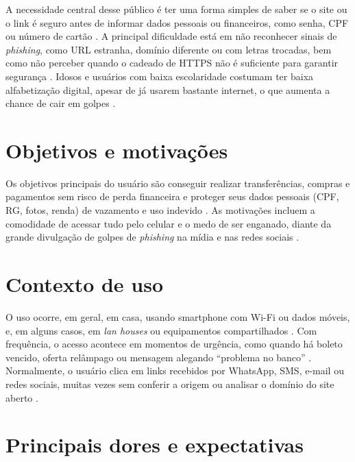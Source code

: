 \documentclass[
  12pt,
  a4paper,
  oneside,
  brazil
]{abntex2}
\begin{document}
A necessidade central desse público é ter uma forma simples de saber se o site ou o link é
seguro antes de informar dados pessoais ou financeiros, como senha, CPF ou número de cartão
\cite{abecs2023, certbr2024}. A principal dificuldade está em não reconhecer sinais de
\textit{phishing}, como URL estranha, domínio diferente ou com letras trocadas, bem como não
perceber quando o cadeado de HTTPS não é suficiente para garantir segurança \cite{certbr2024}.
Idosos e usuários com baixa escolaridade costumam ter baixa alfabetização digital, apesar de já
usarem bastante internet, o que aumenta a chance de cair em golpes
\cite{ibge_pnad_educ2023, educafcc2022}.

\section{Objetivos e motivações}

Os objetivos principais do usuário são conseguir realizar transferências, compras e pagamentos
sem risco de perda financeira e proteger seus dados pessoais (CPF, RG, fotos, renda) de
vazamento e uso indevido \cite{bcb_rig2024, abecs2023}. As motivações incluem a comodidade de
acessar tudo pelo celular e o medo de ser enganado, diante da grande divulgação de golpes de
\textit{phishing} na mídia e nas redes sociais \cite{abecs2023, certbr2024}.

\section{Contexto de uso}

O uso ocorre, em geral, em casa, usando smartphone com Wi-Fi ou dados móveis, e, em alguns
casos, em \textit{lan houses} ou equipamentos compartilhados \cite{ibge_tic2023}. Com
frequência, o acesso acontece em momentos de urgência, como quando há boleto vencido, oferta
relâmpago ou mensagem alegando ``problema no banco'' \cite{abecs2023, bcb_rig2024}. Normalmente,
o usuário clica em links recebidos por WhatsApp, SMS, e-mail ou redes sociais, muitas vezes sem
conferir a origem ou analisar o domínio do site aberto \cite{certbr2024}.

\section{Principais dores e expectativas}
\end{document}
